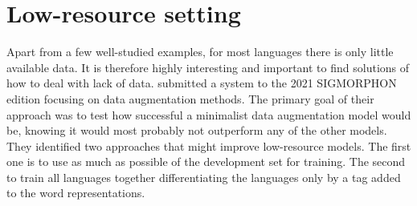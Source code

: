 \section{Low-resource setting}
Apart from a few well-studied examples, for most languages there is only little available data. It is therefore highly interesting and important to find solutions of how to deal with lack of data. \cite{hammond-2021-data} submitted a system to the 2021 SIGMORPHON edition focusing on data augmentation methods. The primary goal of their approach was to test how successful a minimalist data augmentation model would be, knowing it would most probably not outperform any of the other models. They identified two approaches that might improve low-resource models. The first one is to use as much as possible of the development set for training. The second to train all languages together differentiating the languages only by a tag added to the word representations. 




